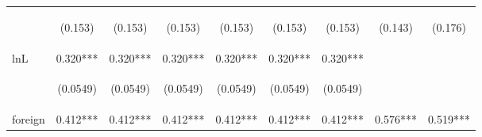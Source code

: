 \begin{center}
\begin{tabular}{lcccccccc}
\vspace{4pt} & \begin{footnotesize}(0.153)\end{footnotesize} & \begin{footnotesize}(0.153)\end{footnotesize} & \begin{footnotesize}(0.153)\end{footnotesize} & \begin{footnotesize}(0.153)\end{footnotesize} & \begin{footnotesize}(0.153)\end{footnotesize} & \begin{footnotesize}(0.153)\end{footnotesize} & \begin{footnotesize}(0.143)\end{footnotesize} & \begin{footnotesize}(0.176)\end{footnotesize} \\
lnL & 0.320*** & 0.320*** & 0.320*** & 0.320*** & 0.320*** & 0.320*** &  &  \\
\vspace{4pt} & \begin{footnotesize}(0.0549)\end{footnotesize} & \begin{footnotesize}(0.0549)\end{footnotesize} & \begin{footnotesize}(0.0549)\end{footnotesize} & \begin{footnotesize}(0.0549)\end{footnotesize} & \begin{footnotesize}(0.0549)\end{footnotesize} & \begin{footnotesize}(0.0549)\end{footnotesize} & \begin{footnotesize}\end{footnotesize} & \begin{footnotesize}\end{footnotesize} \\
foreign & 0.412*** & 0.412*** & 0.412*** & 0.412*** & 0.412*** & 0.412*** & 0.576*** & 0.519*** \\

\end{tabular}
\end{center}
